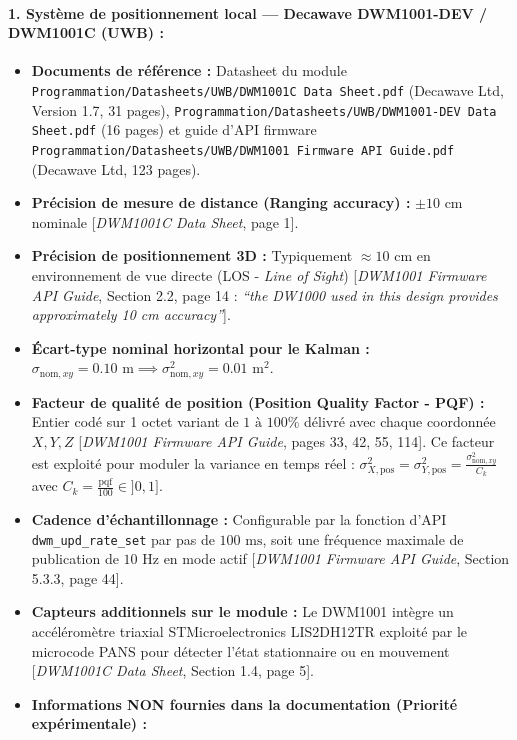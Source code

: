 \documentclass[../Formulations_Kalman.tex]{subfiles}
\begin{document}
\paragraph{1. Système de positionnement local — Decawave DWM1001-DEV / DWM1001C (UWB) :}
\begin{itemize}
    \item \textbf{Documents de référence :} Datasheet du module \texttt{Programmation/Datasheets/UWB/DWM1001C Data Sheet.pdf} (Decawave Ltd, Version 1.7, 31 pages), \texttt{Programmation/Datasheets/UWB/DWM1001-DEV Data Sheet.pdf} (16 pages) et guide d'API firmware \texttt{Programmation/Datasheets/UWB/DWM1001 Firmware API Guide.pdf} (Decawave Ltd, 123 pages).
    \item \textbf{Précision de mesure de distance (Ranging accuracy) :} $\pm 10\text{ cm}$ nominale [\textit{DWM1001C Data Sheet}, page 1].
    \item \textbf{Précision de positionnement 3D :} Typiquement $\approx 10\text{ cm}$ en environnement de vue directe (LOS - \textit{Line of Sight}) [\textit{DWM1001 Firmware API Guide}, Section 2.2, page 14 : \textit{“the DW1000 used in this design provides approximately 10 cm accuracy”}].
    \item \textbf{Écart-type nominal horizontal pour le Kalman :} $\sigma_{\text{nom},xy} = 0.10\text{ m} \implies \sigma_{\text{nom},xy}^2 = 0.01\text{ m}^2$.
    \item \textbf{Facteur de qualité de position (Position Quality Factor - PQF) :} Entier codé sur 1 octet variant de $1\text{ à }100\%$ délivré avec chaque coordonnée $X, Y, Z$ [\textit{DWM1001 Firmware API Guide}, pages 33, 42, 55, 114]. Ce facteur est exploité pour moduler la variance en temps réel : $\sigma_{X,\text{pos}}^2 = \sigma_{Y,\text{pos}}^2 = \frac{\sigma_{\text{nom},xy}^2}{C_k}$ avec $C_k = \frac{\text{pqf}}{100} \in ]0, 1]$.
    \item \textbf{Cadence d'échantillonnage :} Configurable par la fonction d'API \texttt{dwm\_upd\_rate\_set} par pas de $100\text{ ms}$, soit une fréquence maximale de publication de $10\text{ Hz}$ en mode actif [\textit{DWM1001 Firmware API Guide}, Section 5.3.3, page 44].
    \item \textbf{Capteurs additionnels sur le module :} Le DWM1001 intègre un accéléromètre triaxial STMicroelectronics LIS2DH12TR exploité par le microcode PANS pour détecter l'état stationnaire ou en mouvement [\textit{DWM1001C Data Sheet}, Section 1.4, page 5].
    \item \textbf{Informations NON fournies dans la documentation (Priorité expérimentale) :}

\end{itemize}
\end{document}
